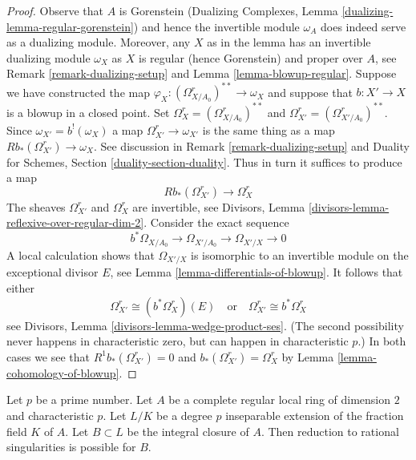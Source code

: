 \begin{proof}
Observe that $A$ is Gorenstein (Dualizing Complexes,
Lemma \ref{dualizing-lemma-regular-gorenstein})
and hence the invertible module $\omega_A$ does indeed serve
as a dualizing module. Moreover, any $X$ as in the lemma
has an invertible dualizing module $\omega_X$ as $X$ is regular
(hence Gorenstein) and proper over $A$, see
Remark \ref{remark-dualizing-setup} and
Lemma \ref{lemma-blowup-regular}.
Suppose we have constructed the map
$\varphi_X : (\Omega^r_{X/A_0})^{**} \to \omega_X$
and suppose that $b : X' \to X$ is a blowup in a closed point.
Set $\Omega^r_X = (\Omega^r_{X/A_0})^{**}$ and
$\Omega^r_{X'} = (\Omega^r_{X'/A_0})^{**}$. Since $\omega_{X'} = b^!(\omega_X)$
a map $\Omega^r_{X'} \to \omega_{X'}$ is the same thing as a map
$Rb_*(\Omega^r_{X'}) \to \omega_X$. See discussion in
Remark \ref{remark-dualizing-setup} and
Duality for Schemes, Section \ref{duality-section-duality}.
Thus in turn it suffices to produce a map
$$
Rb_*(\Omega^r_{X'}) \longrightarrow \Omega^r_X
$$
The sheaves $\Omega^r_{X'}$ and $\Omega^r_X$ are invertible, see
Divisors, Lemma \ref{divisors-lemma-reflexive-over-regular-dim-2}.
Consider the exact sequence
$$
b^*\Omega_{X/A_0} \to \Omega_{X'/A_0} \to \Omega_{X'/X} \to 0
$$
A local calculation shows that $\Omega_{X'/X}$ is isomorphic
to an invertible module on the exceptional divisor $E$, see
Lemma \ref{lemma-differentials-of-blowup}. It follows that
either
$$
\Omega^r_{X'} \cong (b^*\Omega^r_X)(E)
\quad\text{or}\quad
\Omega^r_{X'} \cong b^*\Omega^r_X
$$
see Divisors, Lemma \ref{divisors-lemma-wedge-product-ses}.
(The second possibility never happens in characteristic zero, but
can happen in characteristic $p$.) In both cases we see that
$R^1b_*(\Omega^r_{X'}) = 0$ and $b_*(\Omega^r_{X'}) = \Omega^r_X$ by
Lemma \ref{lemma-cohomology-of-blowup}.
\end{proof}

\begin{lemma}
\label{lemma-go-up-degree-p}
Let $p$ be a prime number. Let $A$ be a complete regular local ring of
dimension $2$ and characteristic $p$. Let $L/K$ be a degree $p$ inseparable
extension of the fraction field $K$ of $A$. Let $B \subset L$ be the integral
closure of $A$. Then reduction to rational singularities is possible for $B$.
\end{lemma}

